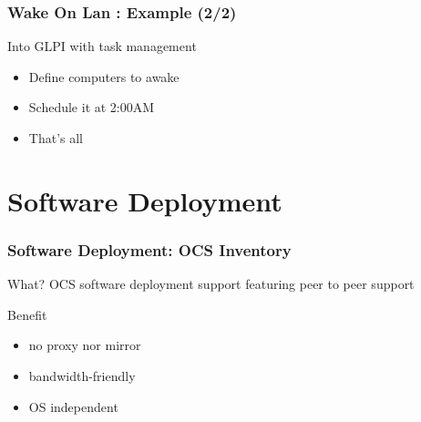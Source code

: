 \documentclass{beamer}
\begin{document}
\begin{frame}
    \frametitle{Wake On Lan : Example (2/2)}


    \begin{block}{Into GLPI with task management}
    \begin{itemize}
    \item Define computers to awake
    \item Schedule it at 2:00AM
    \item That's all
    \end{itemize}
    \end{block}

\end{frame}

\section{Software Deployment}

\begin{frame}
    \frametitle{Software Deployment: OCS Inventory}

    \begin{block}{What?}
    OCS software deployment support featuring peer to peer support
    \end{block}

    \begin{block}{Benefit}
    \begin{itemize}
        \item no proxy nor mirror
        \item bandwidth-friendly
        \item OS independent
    \end{itemize}
    \end{block}
\end{frame}
\end{document}
